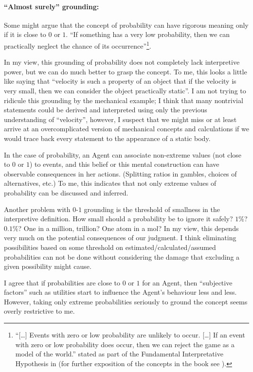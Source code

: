 \documentclass{article}
\begin{document}
\paragraph{``Almost surely'' grounding:}
Some might argue that the concept of probability can have rigorous meaning only if it is close to $0$ or $1$. ``If something has a very low probability, then we can practically neglect the chance of its occurrence''\footnote{``[\dots] Events with zero or low probability are unlikely to occur. [\dots] If an event with zero or low probability does occur, then we can reject the game as a model of the world.'' stated as part of the Fundamental Interpretative Hypothesis in \cite{book:ProbabilityAndFinanceGame} (for further exposition of the concepts in the book see \cite{book:GameTheoreticProbability}).}.

In my view, this grounding of probability does not completely lack interpretive power, but we can do much better to grasp the concept. To me, this looks a little like saying that ``velocity is such a property of an object that if the velocity is very small, then we can consider the object practically static''. I am not trying to ridicule this grounding by the mechanical example; I think that many nontrivial statements could be derived and interpreted using only the previous understanding of ``velocity'', however, I suspect that we might miss or at least arrive at an overcomplicated version of mechanical concepts and calculations if we would trace back every statement to the appearance of a static body.

In the case of probability, an Agent can associate non-extreme values (not close to $0$ or $1$) to events, and this belief or this mental construction can have observable consequences in her actions. (Splitting ratios in gambles, choices of alternatives, etc.)
To me, this indicates that not only extreme values of probability can be discussed and inferred.

Another problem with $0$-$1$ grounding is the threshold of smallness in the interpretive definition. How small should a probability be to ignore it safely? $1\%$? $0.1\%$? One in a million, trillion? One atom in a mol?
In my view, this depends very much on the potential consequences of our judgment. I think eliminating possibilities based on some threshold on estimated/calculated/assumed probabilities can not be done without considering the damage that excluding a given possibility might cause.

I agree that if probabilities are close to $0$ or $1$ for an Agent, then ``subjective factors'' such as utilities start to influence the Agent's behaviour less and less. However, taking only extreme probabilities seriously to ground the concept seems overly restrictive to me.
\end{document}
